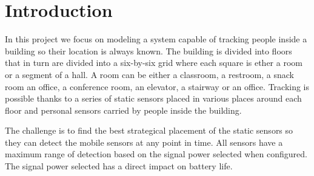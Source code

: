 \section{Introduction}
In this project we focus on modeling a system capable of tracking
people inside a building so their location is always known. 
The building is divided into floors that in turn are divided into a six-by-six
grid where each square is ether a room or a segment of a hall. A room can be either
a classroom, a restroom, a snack room an office, a conference room, an elevator, 
a stairway  or an office.
Tracking
is possible thanks to a series of static sensors placed in various places around
each floor and personal sensors carried by people inside the building.
 
The challenge is to find the best strategical placement of the static sensors so
they can detect the mobile sensors at any point in time. All sensors have a maximum
range of detection based on the signal power selected when configured. The signal
power selected has a direct impact on battery life.
